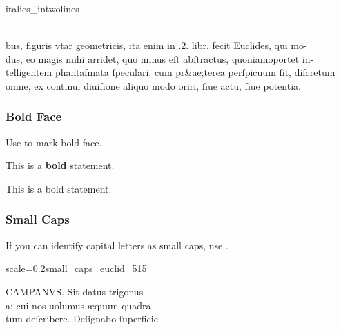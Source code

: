 \begin{sampleImage}{italics_intwolines}
\begin{typeLatin}
 \someText\\
bus, figuris vtar geometricis, ita enim in .2. libr. fecit Euclides, qui mo- \\
dus, eo magis mihi arridet, quo minus eſt abſtractus, quoniam\lwr oportet in- \\
telligentem phantaſmata ſpeculari, cum pr&ae;terea perſpicuum ſit, diſcretum \\
omne, ex continui diuiſione aliquo modo oriri, ſiue actu, ſiue potentia. \\
\someText {}
\end{typeLatin}
\end{sampleImage}


\subsubsection{Bold Face}
\label{section bold face}

\begin{mainruleLessImportant}
Use  to mark bold face.
\end{mainruleLessImportant}

\begin{example}

\vspace{-4mm}
This is a \textbf{bold}  statement.

\begin{typeLatin}
This is a bold statement.
\end{typeLatin}
\end{example}

\subsubsection{Small Caps}
\label{section small caps}

\begin{mainrule}
If you can identify capital letters as small caps, use .
\end{mainrule}

\vspace{3mm}
\begin{sampleImageSmall}{scale=0.2}{small_caps_euclid_515}

\begin{typeLatin}
CAMPANVS. Sit datus trigonus \\
a: cui nos uolumus æquum quadra- \\
tum deſcribere. Deſignabo ſuperfici\bs\tld{}e  \\
\someText {} \\
\end{typeLatin}

\end{sampleImageSmall}

